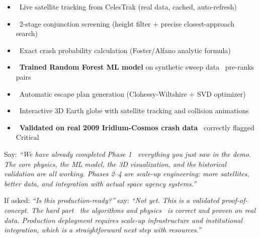 \documentclass[11pt,a4paper]{article}
\begin{document}
\begin{tcolorbox}[colback=spacegreen!8, colframe=spacegreen!60, title=\textbf{Phase 1 \textemdash\ Delivered (SIH Prototype)}]
\begin{itemize}[leftmargin=1.2em, itemsep=1pt]
  \item \checkmark\ Live satellite tracking from CelesTrak (real data, cached, auto-refresh)
  \item \checkmark\ 2-stage conjunction screening (height filter + precise closest-approach search)
  \item \checkmark\ Exact crash probability calculation (Foster/Alfano analytic formula)
  \item \checkmark\ \textbf{Trained Random Forest ML model} on synthetic sweep data \textemdash\ pre-ranks pairs
  \item \checkmark\ Automatic escape plan generation (Clohessy-Wiltshire + SVD optimizer)
  \item \checkmark\ Interactive 3D Earth globe with satellite tracking and collision animations
  \item \checkmark\ \textbf{Validated on real 2009 Iridium-Cosmos crash data} \textemdash\ correctly flagged Critical
\end{itemize}
\end{tcolorbox}

\begin{presenterbox}
Say: \textit{``We have already completed Phase 1 \textemdash\ everything you just saw in the demo. The core physics, the ML model, the 3D visualization, and the historical validation are all working. Phases 2--4 are scale-up engineering: more satellites, better data, and integration with actual space agency systems.''}

If asked: \textit{``Is this production-ready?''} say: \textit{``Not yet. This is a validated proof-of-concept. The hard part \textemdash\ the algorithms and physics \textemdash\ is correct and proven on real data. Production deployment requires scale-up infrastructure and institutional integration, which is a straightforward next step with resources.''}
\end{presenterbox}
\end{document}
